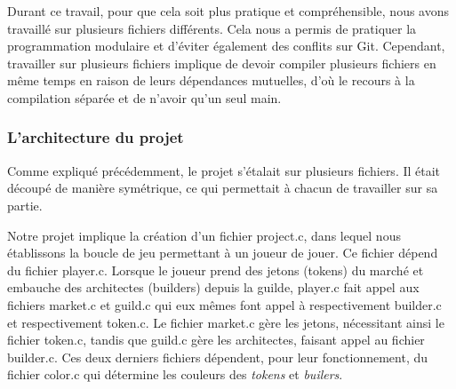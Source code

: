 \documentclass{article}
\begin{document}
\hspace{1em}Durant ce travail, pour que cela soit plus pratique et compréhensible, nous avons travaillé sur plusieurs fichiers différents. Cela nous a permis de pratiquer la programmation modulaire et d'éviter également des conflits sur Git. Cependant, travailler sur plusieurs fichiers implique de devoir compiler plusieurs fichiers en même temps en raison de leurs dépendances mutuelles, d'où le recours à la compilation séparée et de n'avoir qu'un seul main. 

\subsubsection{L'architecture du projet}
 
\hspace{1em}Comme expliqué précédemment, le projet s'étalait sur plusieurs fichiers. Il était découpé de manière symétrique, ce qui permettait à chacun de travailler sur sa partie.

\hspace{1em}


\begin{minipage}{0.6\textwidth} \label{schema}
\end{minipage}
\begin{minipage}{0.4\textwidth}

Notre projet implique la création d'un fichier project.c, dans lequel nous établissons la boucle de jeu permettant à un joueur de jouer. Ce fichier dépend du fichier player.c. Lorsque le joueur prend des jetons (tokens) du marché et embauche des architectes (builders) depuis la guilde, player.c fait appel aux fichiers market.c et guild.c qui eux mêmes font appel à respectivement builder.c et respectivement token.c. Le fichier market.c gère les jetons, nécessitant ainsi le fichier token.c, tandis que guild.c gère les architectes, faisant appel au fichier builder.c. Ces deux derniers fichiers dépendent, pour leur fonctionnement, du fichier color.c qui détermine les couleurs des \emph{tokens} et \emph{builers}.




\end{minipage}
\end{document}
